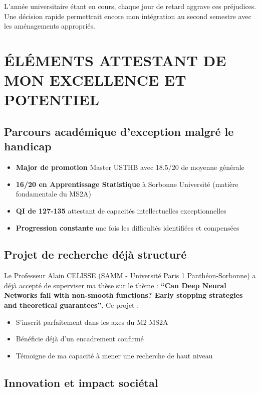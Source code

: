 \documentclass[12pt,french,a4paper]{article}
\begin{document}
L'année universitaire étant en cours, chaque jour de retard aggrave ces préjudices. Une décision rapide permettrait encore mon intégration au second semestre avec les aménagements appropriés.

\section{ÉLÉMENTS ATTESTANT DE MON EXCELLENCE ET POTENTIEL}

\subsection{Parcours académique d'exception malgré le handicap}

\begin{itemize}
\item \textbf{Major de promotion} Master USTHB avec 18.5/20 de moyenne générale
\item \textbf{16/20 en Apprentissage Statistique} à Sorbonne Université (matière fondamentale du MS2A)
\item \textbf{QI de 127-135} attestant de capacités intellectuelles exceptionnelles
\item \textbf{Progression constante} une fois les difficultés identifiées et compensées
\end{itemize}

\subsection{Projet de recherche déjà structuré}

Le Professeur Alain CELISSE (SAMM - Université Paris 1 Panthéon-Sorbonne) a déjà accepté de superviser ma thèse sur le thème : \textbf{``Can Deep Neural Networks fail with non-smooth functions? Early stopping strategies and theoretical guarantees''}. Ce projet :
\begin{itemize}
\item S'inscrit parfaitement dans les axes du M2 MS2A
\item Bénéficie déjà d'un encadrement confirmé
\item Témoigne de ma capacité à mener une recherche de haut niveau
\end{itemize}

\subsection{Innovation et impact sociétal}
\end{document}
